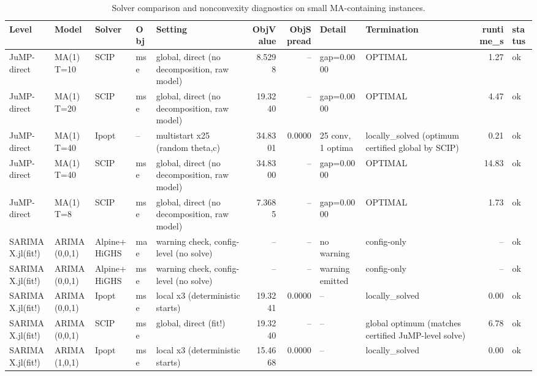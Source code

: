 \begin{table}[t]
\centering
\caption{Solver comparison and nonconvexity diagnostics on small MA-containing instances.}
\label{tab:solver_comparison}
\begin{tabular}{lllllrrllrl}
\hline
Level & Model & Solver & Obj & Setting & ObjValue & ObjSpread & Detail & Termination & runtime\_s & status \\
\hline
JuMP-direct & MA(1) T=10 & SCIP & mse & global, direct (no decomposition, raw model) & 8.5298 & -- & gap=0.0000 & OPTIMAL & 1.27 & ok \\
JuMP-direct & MA(1) T=20 & SCIP & mse & global, direct (no decomposition, raw model) & 19.3240 & -- & gap=0.0000 & OPTIMAL & 4.47 & ok \\
JuMP-direct & MA(1) T=40 & Ipopt & -- & multistart x25 (random theta,c) & 34.8301 & 0.0000 & 25 conv, 1 optima & locally\_solved (optimum certified global by SCIP) & 0.21 & ok \\
JuMP-direct & MA(1) T=40 & SCIP & mse & global, direct (no decomposition, raw model) & 34.8300 & -- & gap=0.0000 & OPTIMAL & 14.83 & ok \\
JuMP-direct & MA(1) T=8 & SCIP & mse & global, direct (no decomposition, raw model) & 7.3685 & -- & gap=0.0000 & OPTIMAL & 1.73 & ok \\
SARIMAX.jl(fit!) & ARIMA(0,0,1) & Alpine+HiGHS & mae & warning check, config-level (no solve) & -- & -- & no warning & config-only & -- & ok \\
SARIMAX.jl(fit!) & ARIMA(0,0,1) & Alpine+HiGHS & mse & warning check, config-level (no solve) & -- & -- & warning emitted & config-only & -- & ok \\
SARIMAX.jl(fit!) & ARIMA(0,0,1) & Ipopt & mse & local x3 (deterministic starts) & 19.3241 & 0.0000 & -- & locally\_solved & 0.00 & ok \\
SARIMAX.jl(fit!) & ARIMA(0,0,1) & SCIP & mse & global, direct (fit!) & 19.3240 & -- & -- & global optimum (matches certified JuMP-level solve) & 6.78 & ok \\
SARIMAX.jl(fit!) & ARIMA(1,0,1) & Ipopt & mse & local x3 (deterministic starts) & 15.4668 & 0.0000 & -- & locally\_solved & 0.00 & ok \\
\hline
\end{tabular}
\end{table}